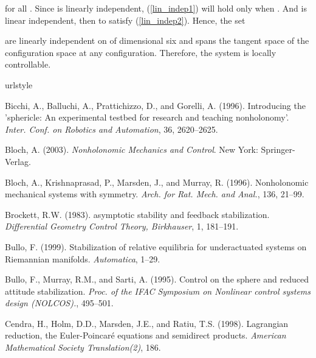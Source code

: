 \documentclass{ifacconf}
\begin{document}
for all . Since  is linearly independent, (\ref{lin_indep1}) will hold only when .  And    is linear independent, then  to satisfy (\ref{lin_indep2}). Hence, the set
 
are linearly independent on  of dimensional six and spans the tangent space of the configuration space at any configuration. Therefore, the system is locally controllable. 
\begin{thebibliography}{26}
\providecommand{\natexlab}[1]{#1}
\providecommand{\url}[1]{\texttt{#1}}
\providecommand{\urlprefix}{URL }
\expandafter\ifx\csname urlstyle\endcsname\relax
  \providecommand{\doi}[1]{doi:\discretionary{}{}{}#1}\else
  \providecommand{\doi}{doi:\discretionary{}{}{}\begingroup
  \urlstyle{rm}\Url}\fi

Bicchi, A., Balluchi, A., Prattichizzo, D., and Gorelli, A. (1996).
\newblock Introducing the 'sphericle: An experimental testbed for research and
  teaching nonholonomy'.
\newblock \emph{Inter. Conf. on Robotics and Automation}, 36, 2620--2625.

Bloch, A. (2003).
\newblock \emph{Nonholonomic Mechanics and Control}.
\newblock New York: Springer-Verlag.

Bloch, A., Krishnaprasad, P., Marsden, J., and Murray, R. (1996).
\newblock Nonholonomic mechanical systems with symmetry.
\newblock \emph{Arch. for Rat. Mech. and Anal.}, 136, 21--99.

Brockett, R.W. (1983).
\newblock asymptotic stability and feedback stabilization.
\newblock \emph{Differential {G}eometry {C}ontrol {T}heory, {B}irkhauser}, 1,
  181--191.

Bullo, F. (1999).
\newblock Stabilization of relative equilibria for underactuated systems on
  {R}iemannian manifolds.
\newblock \emph{Automatica}, 1--29.

Bullo, F., Murray, R.M., and Sarti, A. (1995).
\newblock Control on the sphere and reduced attitude stabilization.
\newblock \emph{Proc. of the {IFAC} Symposium on Nonlinear control systems
  design ({NOLCOS}).}, 495--501.

Cendra, H., Holm, D.D., Marsden, J.E., and Ratiu, T.S. (1998).
\newblock Lagrangian reduction, the {E}uler-{P}oincar\'{e} equations and
  semidirect products.
\newblock \emph{American Mathematical Society Translation(2)}, 186.


\end{thebibliography}
\end{document}
